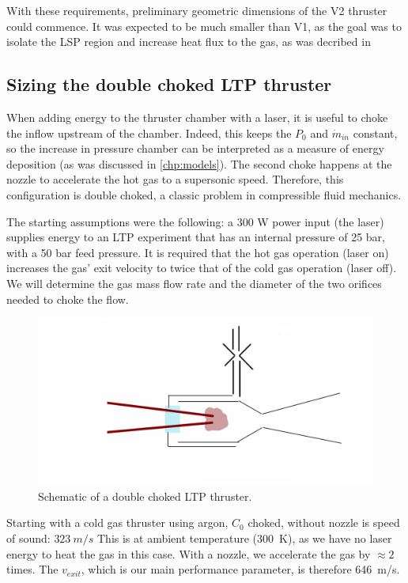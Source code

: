             With these requirements, preliminary geometric dimensions of the V2 thruster could commence. It was expected to be much smaller than V1, as the goal was to isolate the LSP region and increase heat flux to the gas, as was decribed in \

        \subsection{Sizing the double choked LTP thruster} 

            When adding energy to the thruster chamber with a laser, it is useful to choke the inflow upstream of the chamber. Indeed, this keeps the $P_0$ and $\dot{m}_{in}$ constant, so the increase in pressure chamber can be interpreted as a measure of energy deposition (as was discussed in \autoref{chp:models}). The second choke happens at the nozzle to accelerate the hot gas to a supersonic speed. Therefore, this configuration is double choked, a classic problem in compressible fluid mechanics.
            
            The starting assumptions were the following: a 300 W power input (the laser) supplies energy to an LTP experiment that has an internal pressure of 25 bar, with a 50 bar feed pressure. It is required that the hot gas operation (laser on) increases the gas' exit velocity to twice that of the cold gas operation (laser off). We will determine the gas mass flow rate and the diameter of the two orifices needed to choke the flow.

            \begin{figure}[h]
            \centering
            \includegraphics[width=0.8\linewidth]{assets/3 design/double choked sizing.png}
            \caption{\label{fig:double choke sizing}Schematic of a double choked LTP thruster.}
            \end{figure}
            
            Starting with a cold gas thruster using argon, $C_0$ choked, without nozzle is speed of sound: $323 \:m/s$ This is at ambient temperature (\qty{300}{K}), as we have no laser energy to heat the gas in this case. With a nozzle, we accelerate the gas by $\approx 2$ times. The $v_{exit}$, which is our main performance parameter, is therefore \qty{646}{m/s}.
            
